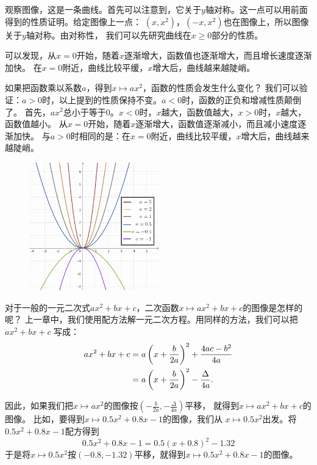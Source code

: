 \documentclass[12pt,UTF8]{ctexbook}
\begin{document}
观察图像，这是一条曲线。首先可以注意到，它关于$y$轴对称。这一点可以用前面得到的性质证明。给定图像上一点：
$(x, x^2)$，$(-x, x^2)$也在图像上，所以图像关于$y$轴对称。由对称性，
我们可以先研究曲线在$x\geqslant 0$部分的性质。

可以发现，从$x=0$开始，随着$x$逐渐增大，函数值也逐渐增大，而且增长速度逐渐加快。
在$x=0$附近，曲线比较平缓，$x$增大后，曲线越来越陡峭。

如果把函数乘以系数$a$，得到$x\mapsto ax^2$，函数的性质会发生什么变化？
我们可以验证：$a > 0$时，以上提到的性质保持不变。$a < 0$时，函数的正负和增减性质颠倒了。
首先，$ax^2$总小于等于$0$。$x<0$时，$x$越大，函数值越大，$x>0$时，$x$越大，函数值越小。
从$x=0$开始，随着$x$逐渐增大，函数值逐渐减小，而且减小速度逐渐加快。
与$a>0$时相同的是：在$x=0$附近，曲线比较平缓，$x$增大后，曲线越来越陡峭。

\begin{figure}[h] %
    \vspace{8pt}
    \centering
    \includegraphics[width=0.5\textwidth]{二次函数2.png}
\end{figure}

对于一般的一元二次式$ax^2+bx+c$，二次函数$x\mapsto ax^2+bx+c$的图像是怎样的呢？
上一章中，我们使用配方法解一元二次方程。用同样的方法，我们可以把$ax^2+bx+c$
写成：
\begin{align}
    ax^2+bx+c &= a\left(x + \frac{b}{2a}\right)^2 + \frac{4ac - b^2}{4a} \notag \\
    &= a\left(x + \frac{b}{2a}\right)^2 - \frac{\Delta}{4a}. \notag
\end{align}

因此，如果我们把$x\mapsto ax^2$的图像按$\left(-\frac{b}{2a}, -\frac{\Delta}{4a}\right)$平移，
就得到$x\mapsto ax^2+bx+c$的图像。
比如，要得到$x\mapsto 0.5x^2+0.8x-1$的图像，我们从
$x\mapsto 0.5x^2$出发。将$0.5x^2+0.8x-1$配方得到
$$ 0.5x^2+0.8x-1 = 0.5\left(x + 0.8\right)^2 - 1.32$$
于是将$x\mapsto 0.5x^2$按$(-0.8, -1.32)$平移，就得到$x\mapsto 0.5x^2+0.8x-1$的图像。
\end{document}
